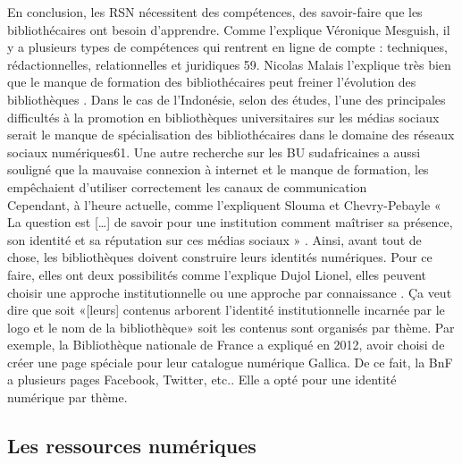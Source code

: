 \documentclass[a4paper,11pt]{article} %
\begin{document}
En conclusion, les RSN nécessitent des compétences, des savoir-faire que les bibliothécaires ont besoin d’apprendre. Comme l’explique Véronique Mesguish, il y a plusieurs types de compétences qui rentrent en ligne de compte : techniques, rédactionnelles, relationnelles et juridiques 59. Nicolas Malais l’explique très bien que le manque de formation des bibliothécaires peut freiner l’évolution des bibliothèques \citep{di2018produire,}. Dans le cas de l’Indonésie, selon des études, l’une des principales difficultés à la promotion en bibliothèques universitaires sur les médias sociaux serait le manque de spécialisation des bibliothécaires dans le domaine des réseaux sociaux numériques61. Une autre recherche sur les BU sudafricaines a aussi souligné que la mauvaise connexion à internet et le manque de formation, les empêchaient d’utiliser correctement les canaux de communication \citep{rabatseta2021adoption,}\\

Cependant, à l’heure actuelle, comme l’expliquent Slouma et Chevry-Pebayle « La question est […] de savoir pour une institution comment maîtriser sa présence, son identité et sa réputation sur ces médias sociaux » \citep{slouma2018presence,}. Ainsi, avant tout de chose, les bibliothèques doivent construire leurs identités numériques. Pour ce faire, elles ont deux possibilités comme l’explique Dujol Lionel, elles peuvent choisir une approche institutionnelle ou une approche par connaissance \citep{di2018produire,}. Ça veut dire que soit «[leurs] contenus arborent l’identité institutionnelle incarnée par le logo et le nom de la bibliothèque» \citep{stylianou2015review,} soit les contenus sont organisés par thème. Par exemple, la Bibliothèque nationale de France a expliqué en 2012, avoir choisi de créer une page spéciale pour leur catalogue numérique Gallica. De ce fait, la BnF a plusieurs pages Facebook, Twitter, etc.\citep{stylianou2015review,}. Elle a opté pour une identité numérique par thème.

\subsection{Les ressources numériques}
\end{document}
